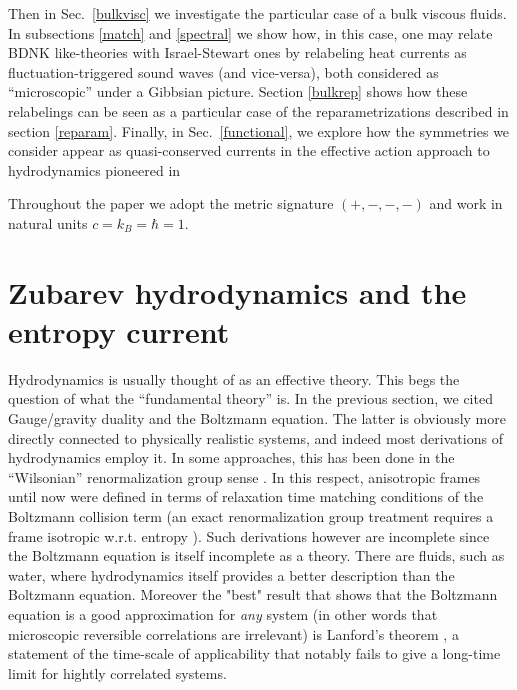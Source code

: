 \documentclass[12pt,onecolumn,showpacs,amssymb,aps,nofootinbib,floatfix]{revtex4-2}
\newcommand{\travis}{}
\newcommand{\masoud}{}
\begin{document}
        Then in Sec.\ \ref{bulkvisc} we investigate the particular case of a bulk viscous fluids.   In subsections \ref{match} and \ref{spectral} we show how, in this case, one may relate BDNK like-theories with Israel-Stewart ones by relabeling heat currents as fluctuation-triggered sound waves (and vice-versa), both considered as ``microscopic'' under a Gibbsian picture.   Section \ref{bulkrep} shows how these relabelings can be seen as a particular case of the reparametrizations described in section \ref{reparam}.
        Finally, in Sec.\ \ref{functional}, we explore how the symmetries we consider appear as quasi-conserved currents in the effective action approach to hydrodynamics pioneered in \cite{grossi}\color{black}

	Throughout the paper we adopt the metric signature $(+,-,-,-)$ and work in natural units $c=k_B=\hbar=1$.
	
	\section{Zubarev hydrodynamics and the entropy current \label{seczub}}
\color{black}Hydrodynamics is usually thought of as an effective theory.  This begs the question of what the ``fundamental theory'' is.   In the previous section, we cited Gauge/gravity duality and the Boltzmann equation.   The latter is obviously more directly connected to physically realistic systems, and indeed most derivations of hydrodynamics employ it.   In some approaches, this has been done in the ``Wilsonian'' renormalization group sense \cite{kunihiro,kunihiro2}.   In this respect, anisotropic frames until now were defined in terms of relaxation time matching conditions of the Boltzmann collision term \cite{kovtunani,denicol} (an exact renormalization group treatment requires a frame isotropic w.r.t. entropy \cite{kunihiro2}).
Such derivations however are incomplete since the Boltzmann equation is itself incomplete as a theory.  There are fluids, such as water, where hydrodynamics itself provides a better description than the Boltzmann equation.   Moreover the "best" result that shows that the Boltzmann equation is a good approximation for {\em any} system (in other words that microscopic reversible correlations are irrelevant) is Lanford's theorem \cite{lanford}, a statement of the time-scale of applicability that notably fails to give a long-time limit for hightly correlated systems.
\end{document}
